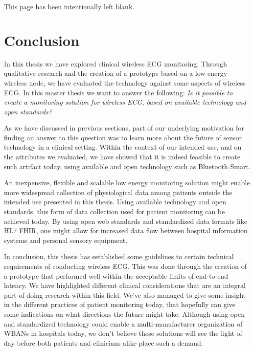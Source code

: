 \newpage
\thispagestyle{empty}
This page has been intentionally left blank.

\newpage


\section{Conclusion} %
\label{sec:conclusion}

In this thesis we have explored clinical wireless ECG monitoring. Through qualitative research and the creation of a prototype based on a low energy wireless node, we have evaluated the technology against some aspects of wireless ECG. In this master thesis we want to answer the following: \textit{Is it possible to create a monitoring solution for wireless ECG, based on available technology and open standards?}

As we have discussed in previous sections, part of our underlying motivation for finding an answer to this question was to learn more about the future of sensor technology in a clinical setting. Within the context of our intended use, and on the attributes we evaluated, we have showed that it is indeed feasible to create such artifact today, using available and open technology such as Bluetooth Smart.

An inexpensive, flexible and scalable low energy monitoring solution might enable more widespread collection of physiological data among patients outside the intended use presented in this thesis. Using available technology and open standards, this form of data collection used for patient monitoring can be achieved today. By using open web standards and standardized data formats like HL7 FHIR, one might allow for increased data flow between hospital information systems and personal sensory equipment.

In conclusion, this thesis has established some guidelines to certain technical requirements of conducting wireless ECG. This was done through the creation of a prototype that performed well within the acceptable limits of end-to-end latency. We have highlighted different clinical considerations that are an integral part of doing research within this field. We've also managed to give some insight in the different practices of patient monitoring today, that hopefully can give some indications on what directions the future might take. Although using open and standardized technology could enable a multi-manufacturer organization of WBANs in hospitals today, we don't believe these solutions will see the light of day before both patients and clinicians alike place such a demand.


